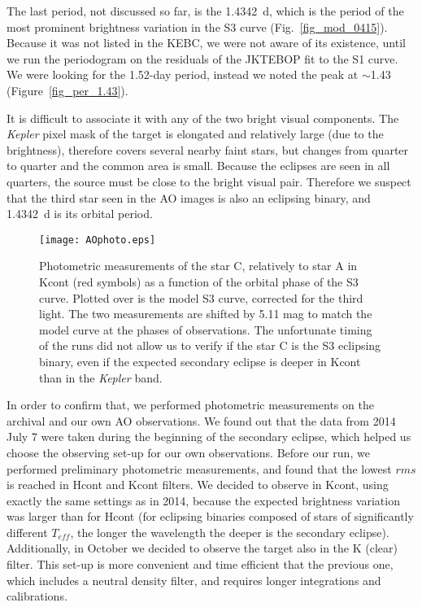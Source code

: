 \documentclass{aa}
\newcommand{\kep}{{\it Kepler }}
\begin{document}
The last period, not discussed so far, is the 1.4342~d, which is the period
of the most prominent brightness variation in the S3 curve (Fig.~\ref{fig_mod_0415}).
Because it was not listed in the KEBC, we were not aware of its existence, 
until we run the periodogram on the residuals of the JKTEBOP fit to the 
S1 curve. We were looking for the 1.52-day period, instead we noted the 
peak at $\sim$1.43 (Figure~\ref{fig_per_1.43}).

It is difficult to associate it with any of the two bright visual 
components. The \kep pixel mask of the target is elongated and relatively large 
(due to the brightness), therefore covers several nearby faint stars, but 
changes from quarter to quarter and the common area is small. Because the
eclipses are seen in all quarters, the source must be close to the bright
visual pair. Therefore we suspect that the third star seen in the AO
images is also an eclipsing binary, and 1.4342~d is its orbital period.

\begin{figure}
\centering
\texttt{[image: AOphoto.eps]}
\caption{Photometric measurements of the star C, relatively to star A in Kcont
(red symbols) as a function of the orbital phase of the S3 curve. Plotted over
is the model S3 curve, corrected for the third light. The two measurements
are shifted by 5.11 mag to match the model curve at the phases of observations.
The unfortunate timing of the runs did not allow us to
verify if the star C is the S3 eclipsing binary, even if the expected 
secondary eclipse is deeper in Kcont than in the \kep band.}\label{fig_ao_photo}
\end{figure}

In order to confirm that, we performed photometric measurements on the
archival and our own AO observations. We found out that the data from 2014
July 7 were taken during the beginning of the secondary eclipse, which helped
us choose the observing set-up for our own observations. Before our run,
we performed preliminary photometric measurements, and found that the lowest
$rms$ is reached in Hcont and Kcont filters. We decided to observe in Kcont,
using exactly the same settings as in 2014, because the expected brightness
variation was larger than for Hcont (for eclipsing binaries composed
of stars of significantly different $T_{eff}$, the longer the wavelength the
deeper is the secondary eclipse). Additionally, in October we decided to 
observe the target also in the K (clear) filter. This set-up is more convenient
and time efficient that the previous one, which includes a neutral density 
filter, and requires longer integrations and calibrations.
\end{document}
